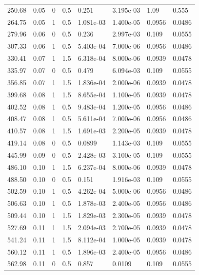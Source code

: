 \documentclass[preview]{standalone}
\begin{document}
{{\begin{tabular}{L{1.2cm}C{1.2cm} C{0.3cm}C{0.5cm} C{1.4cm}C{1.4cm} C{1.4cm}C{1.4cm}}
  250.68  &  0.05  & 0     & 0.5 &  0.251  & 3.195e-03  & 1.09 &  0.555   \\ 
  264.75  &  0.05  & 1     & 0.5 &  1.081e-03  & 1.400e-05  & 0.0956 &  0.0486   \\ 
  279.96  &  0.06  & 0     & 0.5 &  0.236  & 2.997e-03  & 0.109 &  0.0555   \\ 
  307.33  &  0.06  & 1     & 0.5 &  5.403e-04  & 7.000e-06  & 0.0956 &  0.0486   \\ 
  330.41  &  0.07  & 1     & 1.5 &  6.318e-04  & 8.000e-06  & 0.0939 &  0.0478   \\ 
  335.97  &  0.07  & 0     & 0.5 &  0.479  & 6.094e-03  & 0.109 &  0.0555   \\ 
  356.85  &  0.07  & 1     & 1.5 &  1.836e-04  & 2.000e-06  & 0.0939 &  0.0478   \\ 
  399.68  &  0.08  & 1     & 1.5 &  8.655e-04  & 1.100e-05  & 0.0939 &  0.0478   \\ 
  402.52  &  0.08  & 1     & 0.5 &  9.483e-04  & 1.200e-05  & 0.0956 &  0.0486   \\ 
  408.47  &  0.08  & 1     & 0.5 &  5.611e-04  & 7.000e-06  & 0.0956 &  0.0486   \\ 
  410.57  &  0.08  & 1     & 1.5 &  1.691e-03  & 2.200e-05  & 0.0939 &  0.0478   \\ 
  419.14  &  0.08  & 0     & 0.5 &  0.0899  & 1.143e-03  & 0.109 &  0.0555   \\ 
  445.99  &  0.09  & 0     & 0.5 &  2.428e-03  & 3.100e-05  & 0.109 &  0.0555   \\ 
  486.10  &  0.10  & 1     & 1.5 &  6.237e-04  & 8.000e-06  & 0.0939 &  0.0478   \\ 
  488.50  &  0.10  & 0     & 0.5 &  0.151  & 1.916e-03  & 0.109 &  0.0555   \\ 
  502.59  &  0.10  & 1     & 0.5 &  4.262e-04  & 5.000e-06  & 0.0956 &  0.0486   \\ 
  506.63  &  0.10  & 1     & 0.5 &  1.878e-03  & 2.400e-05  & 0.0956 &  0.0486   \\ 
  509.44  &  0.10  & 1     & 1.5 &  1.829e-03  & 2.300e-05  & 0.0939 &  0.0478   \\ 
  527.69  &  0.11  & 1     & 1.5 &  2.094e-03  & 2.700e-05  & 0.0939 &  0.0478   \\ 
  541.24  &  0.11  & 1     & 1.5 &  8.112e-04  & 1.000e-05  & 0.0939 &  0.0478   \\ 
  560.12  &  0.11  & 1     & 0.5 &  1.896e-03  & 2.400e-05  & 0.0956 &  0.0486   \\ 
  562.98  &  0.11  & 0     & 0.5 &  0.857  & 0.0109  & 0.109 &  0.0555   \\ 

\end{tabular}}}
\end{document}
